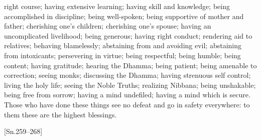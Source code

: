 right course; having extensive learning; having
skill and knowledge; being accomplished in
discipline; being well-spoken; being supportive
of mother and father; cherishing one’s children; cherishing one’s spouse; having an
uncomplicated livelihood; being generous;
having right conduct; rendering aid to relatives; behaving blamelessly; abstaining from
and avoiding evil; abstaining from intoxicants;
persevering in virtue; being respectful; being
humble; being content; having gratitude; hearing the Dhamma; being patient; being amenable to correction; seeing monks; discussing the
Dhamma; having strenuous self control; living
the holy life; seeing the Noble Truths; realizing
Nibbana; being unshakable; being free from
sorrow; having a mind undefiled; having a
mind which is secure.
Those who have done these things see no
defeat and go in safety everywhere: to them
these are the highest blessings.

[Sn.259–268]

